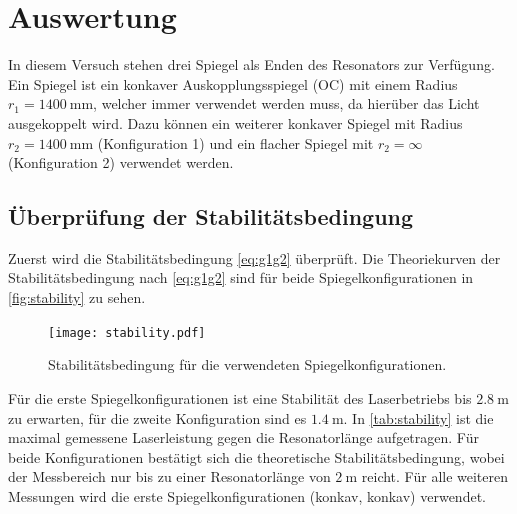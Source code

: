 \section{Auswertung}
\label{sec:Auswertung}
In diesem Versuch stehen drei Spiegel als Enden des Resonators zur Verfügung. Ein Spiegel ist ein konkaver Auskopplungsspiegel (OC) mit einem Radius 
$r_1 = \qty{1400}{\milli\metre}$, welcher immer verwendet werden muss, da hierüber das Licht ausgekoppelt wird.
Dazu können ein weiterer konkaver Spiegel mit Radius $r_2 = \qty{1400}{\milli\metre}$ (Konfiguration 1) und ein flacher Spiegel mit $r_2 = \infty$ (Konfiguration 2) verwendet werden.
\subsection{Überprüfung der Stabilitätsbedingung}
Zuerst wird die Stabilitätsbedingung \eqref{eq:g1g2} überprüft.
Die Theoriekurven der Stabilitätsbedingung nach \autoref{eq:g1g2} sind für beide Spiegelkonfigurationen in \autoref{fig:stability} zu sehen.
\begin{figure}
  \centering
  \texttt{[image: stability.pdf]}
  \caption{Stabilitätsbedingung für die verwendeten Spiegelkonfigurationen.}
  \label{fig:stability}
\end{figure}
Für die erste Spiegelkonfigurationen ist eine Stabilität des Laserbetriebs bis $\qty{2.8}{\metre}$ zu erwarten, für die zweite Konfiguration sind es $\qty{1.4}{\metre}$.
In \autoref{tab:stability} ist die maximal gemessene Laserleistung gegen die Resonatorlänge aufgetragen. Für beide Konfigurationen bestätigt sich die theoretische 
Stabilitätsbedingung, wobei der Messbereich nur bis zu einer Resonatorlänge von $\qty{2}{\metre}$ reicht.
Für alle weiteren Messungen wird die erste Spiegelkonfigurationen (konkav, konkav) verwendet.
